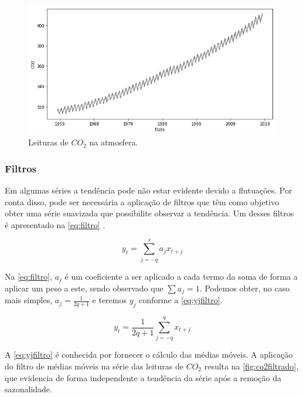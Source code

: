 \documentclass[
    12pt,
    oneside,
    a4paper,
    english,
    brazil
]{abntex2}
\begin{document}
\begin{figure}
    \centering
    \caption{Leituras de $CO_2$ na atmosfera.}\label{fig:co2}
    \includegraphics[width=.6\linewidth]{images/co2.png}
\end{figure}

\subsubsection{Filtros}

Em algumas séries a tendência pode  não estar evidente devido a flutuações. Por
conta disso, pode  ser necessária a aplicação de filtros  que têm como objetivo
obter  uma série  suavizada que  possibilite  observar a  tendência. Um  desses
filtros é apresentado na \autoref{eq:filtro} \cite{ehlers}.

\begin{equation}
    \label{eq:filtro}
    y_t = \sum_{j = -q}^{s}{a_{j}x_{t+j}}
\end{equation}

Na \autoref{eq:filtro}, $a_j$  é um coeficiente a ser aplicado  a cada termo da
soma de forma a aplicar um peso a este, sendo observado que $\sum{a_j} = 1$.
Podemos obter, no caso  mais simples, $a_j = \frac{1}{2q +  1}$ e teremos $y_j$
conforme a \autoref{eq:yjfiltro}.

\begin{equation}
    \label{eq:yjfiltro}
    y_t = \frac{1}{2q + 1}\sum_{j=-q}^{q}{x_{t+j}}
\end{equation}

A \autoref{eq:yjfiltro} é conhecida por fornecer o cálculo das médias móveis.
A aplicação do filtro de médias móveis  na série das leituras de $CO_2$ resulta
na \autoref{fig:co2filtrado},  que evidencia de forma  independente a tendência
da série após a remoção da sazonalidade.
\end{document}
